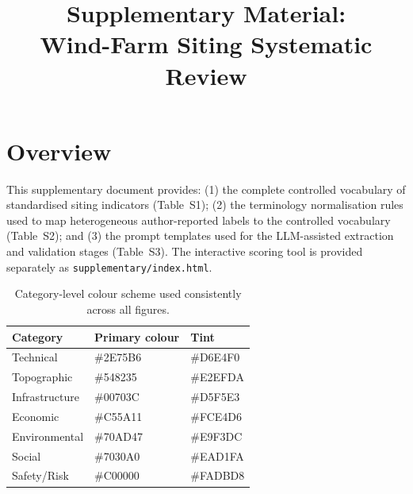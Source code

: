 \documentclass[12pt,a4paper]{article}
\title{Supplementary Material:\\Wind-Farm Siting Systematic Review}
\author{}
\date{}
\begin{document}
\maketitle
\onehalfspacing

\setcounter{table}{0}
\renewcommand{\thetable}{S\arabic{table}}

\section*{Overview}

This supplementary document provides: (1) the complete controlled vocabulary of standardised siting indicators (Table~S1); (2) the terminology normalisation rules used to map heterogeneous author-reported labels to the controlled vocabulary (Table~S2); and (3) the prompt templates used for the LLM-assisted extraction and validation stages (Table~S3). The interactive scoring tool is provided separately as \texttt{supplementary/index.html}.

\bigskip

\begin{table}[htbp]
\centering
\small
\caption{Category-level colour scheme used consistently across all figures.}
\label{tab:colours}
\begin{tabular}{lll}
\toprule
Category & Primary colour & Tint \\
\midrule
Technical & \#2E75B6 & \#D6E4F0 \\
Topographic & \#548235 & \#E2EFDA \\
Infrastructure & \#00703C & \#D5F5E3 \\
Economic & \#C55A11 & \#FCE4D6 \\
Environmental & \#70AD47 & \#E9F3DC \\
Social & \#7030A0 & \#EAD1FA \\
Safety/Risk & \#C00000 & \#FADBD8 \\
\bottomrule
\end{tabular}
\end{table}
\end{document}
